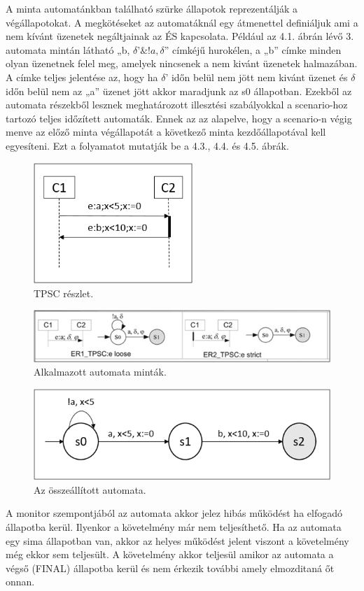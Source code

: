 A minta automatánkban található szürke állapotok reprezentálják a végállapotokat.
A megkötéseket az automatáknál egy átmenettel definiáljuk ami a nem kívánt üzenetek negáltjainak az ÉS kapcsolata.
Például az 4.1. ábrán lévő 3. automata mintán látható „b, $\delta ’\&!a, \delta$” címkéjű hurokélen, a „b” címke minden olyan üzenetnek felel meg, amelyek nincsenek a nem kivánt üzenetek halmazában.
A címke teljes jelentése az, hogy ha $\delta$’ időn belül nem jött nem kivánt üzenet és $\delta$ időn belül nem az „a” üzenet jött akkor maradjunk az s0 állapotban.
Ezekből az automata részekből lesznek meghatározott illesztési szabályokkal a scenario-hoz tartozó teljes időzített automaták.
Ennek az az alapelve, hogy a scenario-n végig menve az előző minta végállapotát a következő minta kezdőállapotával kell egyesíteni.
Ezt a folyamatot mutatják be a 4.3., 4.4. és 4.5. ábrák.

\begin{figure}[!ht]
    \centering
    \includegraphics[width=60mm, keepaspectratio]{figures/7abra.png}
    \caption{TPSC részlet.}
\end{figure}

\begin{figure}[!ht]
    \centering
    \includegraphics[width=150mm, keepaspectratio]{figures/8abra.png}
    \caption{Alkalmazott automata minták.}
\end{figure}

\begin{figure}[!ht]
    \centering
    \includegraphics[width=130mm, keepaspectratio]{figures/9abra.png}
    \caption{Az összeállított automata.}
\end{figure}

A monitor szempontjából az automata akkor jelez hibás működést ha elfogadó állapotba kerül.
Ilyenkor a követelmény már nem teljesíthető.
Ha az automata egy sima állapotban van, akkor az helyes működést jelent viszont a követelmény még ekkor sem teljesült.
A követelmény akkor teljesül amikor az automata a végső (FINAL) állapotba kerül és nem érkezik további amely elmozditaná őt onnan.